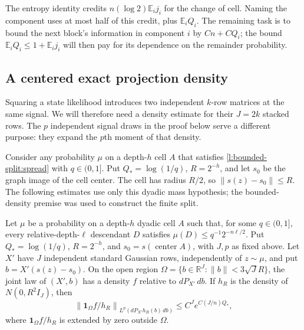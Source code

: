 The entropy identity credits \(n(\log2)\mathbb E_i j_i\) for the
change of cell.  Naming the component uses at most half of this credit,
plus \(\mathbb E_iQ_i\).  The remaining task is to bound the next
block's information in component \(i\) by \(Cn+CQ_i\); the bound
\(\mathbb E_iQ_i\le1+\mathbb E_i j_i\) will then pay for its
dependence on the remainder probability.

\subsection{A centered exact projection density}

Squaring a state likelihood introduces two independent \(k\)-row
matrices at the same signal.  We will therefore need a density estimate
for their \(J=2k\) stacked rows.  The \(p\) independent signal draws
in the proof below serve a different purpose: they expand the \(p\)th
moment of that density.

Consider any probability \(\mu\) on a depth-\(h\) cell \(A\) that
satisfies \eqref{l:bounded-split:spread} with \(q\in(0,1]\).
Put \(Q_*= \log(1/q)\), \(R=2^{-h}\), and let \(s_0\) be the
graph image of the cell center.  The cell has radius \(R/2\), so
\(\|s(z)-s_0\|\le R\).  The following estimates use only this
dyadic mass hypothesis; the bounded-density premise was used to
construct the finite split.

\begin{lemma}
\label{l:bounded-split:density}
Let \(\mu\) be a probability on a depth-\(h\) dyadic cell \(A\)
such that, for some \(q\in(0,1]\), every relative-depth-\(\ell\)
descendant \(D\) satisfies \(\mu(D)\le q^{-1}2^{-n\ell/2}\).
Put \(Q_*=\log(1/q)\), \(R=2^{-h}\), and
\(s_0=s(\operatorname{center}A)\), with \(J,p\) as fixed above.
Let \(X'\) have \(J\) independent standard Gaussian rows, independently
of \(z\sim\mu\), and put \(b=X'(s(z)-s_0)\).
On the open region
\(\Omega=\{b\in\mathbb R^J:\|b\|<3\sqrt J R\}\), the joint law
of \((X',b)\) has a density \(f\) relative to \(dP_{X'}\,db\).
If \(h_R\) is the density of \(N(0,R^2I_J)\), then
\begin{equation}\label{l:bounded-split:reference-norm}
 \left\|\mathbf1_\Omega f/h_R\right\|_
 {L^p(dP_{X'}h_R(b)\,db)}
 \le C^J e^{C(J/n)Q_*},
\end{equation}
where \(\mathbf1_\Omega f/h_R\) is extended by zero outside
\(\Omega\).
\end{lemma}

